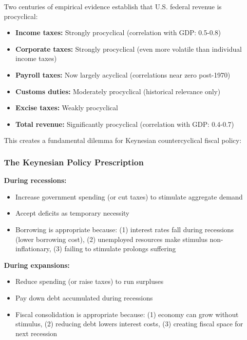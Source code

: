 \documentclass[12pt,letterpaper]{article}
\begin{document}
Two centuries of empirical evidence establish that U.S. federal revenue is procyclical:

\begin{tcolorbox}[colback=yellow!10,colframe=orange,title=\textbf{Summary of Cyclicality Evidence}]
\begin{itemize}
    \item \textbf{Income taxes:} Strongly procyclical (correlation with GDP: 0.5-0.8)
    \item \textbf{Corporate taxes:} Strongly procyclical (even more volatile than individual income taxes)
    \item \textbf{Payroll taxes:} Now largely acyclical (correlations near zero post-1970)
    \item \textbf{Customs duties:} Moderately procyclical (historical relevance only)
    \item \textbf{Excise taxes:} Weakly procyclical
    \item \textbf{Total revenue:} Significantly procyclical (correlation with GDP: 0.4-0.7)
\end{itemize}
\end{tcolorbox}

This creates a fundamental dilemma for Keynesian countercyclical fiscal policy:

\subsubsection{The Keynesian Policy Prescription}

\textbf{During recessions:}
\begin{itemize}
    \item Increase government spending (or cut taxes) to stimulate aggregate demand
    \item Accept deficits as temporary necessity
    \item Borrowing is appropriate because: (1) interest rates fall during recessions (lower borrowing cost), (2) unemployed resources make stimulus non-inflationary, (3) failing to stimulate prolongs suffering
\end{itemize}

\textbf{During expansions:}
\begin{itemize}
    \item Reduce spending (or raise taxes) to run surpluses
    \item Pay down debt accumulated during recessions
    \item Fiscal consolidation is appropriate because: (1) economy can grow without stimulus, (2) reducing debt lowers interest costs, (3) creating fiscal space for next recession
\end{itemize}
\end{document}
